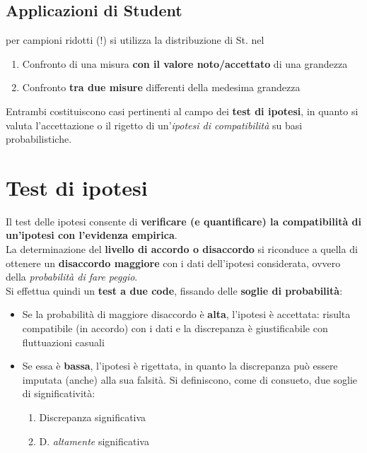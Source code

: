\documentclass[10pt, oneside]{book}
\begin{document}
\subsection*{Applicazioni di Student} per campioni ridotti (!) si utilizza la distribuzione di St. nel
\begin{enumerate}
\item Confronto di una misura \textbf{con il valore noto/accettato} di una grandezza
\item Confronto \textbf{tra due misure} differenti della medesima grandezza
\end{enumerate}
Entrambi costituiscono casi pertinenti al campo dei \textbf{test di ipotesi}, in quanto si valuta l'accettazione o il rigetto di un'\textit{ipotesi di compatibilità} su basi probabilistiche.

\section{Test di ipotesi}
Il test delle ipotesi consente di \textbf{verificare (e quantificare) la compatibilità di un'ipotesi con l'evidenza empirica}.\\
La determinazione del \textbf{livello di accordo o disaccordo} si riconduce a quella di ottenere un \textbf{disaccordo maggiore} con i dati dell'ipotesi considerata, ovvero della \textit{probabilità di fare peggio}.\\
Si effettua quindi un \textbf{test a due code}, fissando delle \textbf{soglie di probabilità}:
\begin{itemize}
\item Se la probabilità di maggiore disaccordo è \textbf{alta}, l'ipotesi è accettata: risulta compatibile (in accordo) con i dati e la discrepanza è giustificabile con fluttuazioni casuali
\item Se essa è \textbf{bassa}, l'ipotesi è rigettata, in quanto la discrepanza può essere imputata (anche) alla sua falsità. Si definiscono, come di consueto, due soglie di significatività:
\begin{enumerate}
\item Discrepanza significativa
\item D. \textit{altamente} significativa
\end{enumerate}
\end{itemize}
\end{document}
